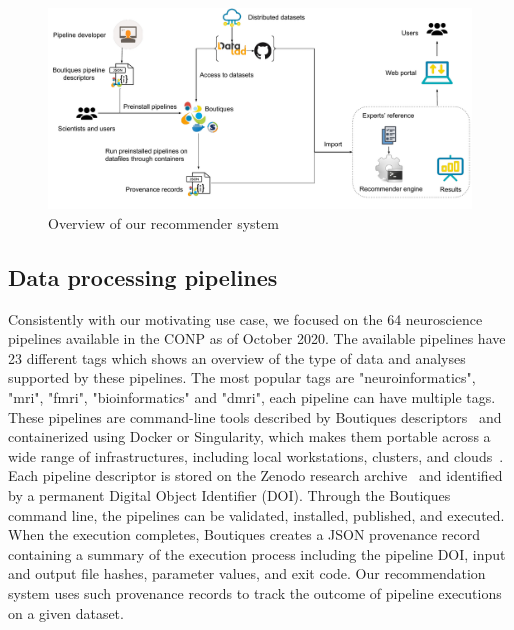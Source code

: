 %   


\begin{figure}[ht]
  \centering
  \includegraphics[width=\textwidth]{figures/Methodology.pdf}%
  \caption{Overview of our recommender system}
  \label{fig:method}
  \end{figure}  


\subsection{Data processing pipelines} 
Consistently with our motivating use case, we focused on the 64
neuroscience pipelines available in the CONP as of October
2020. 
The available pipelines have 23 different tags which shows an overview of the type of data
and analyses supported by these pipelines. The most popular tags are "neuroinformatics", "mri", "fmri", "bioinformatics" and "dmri", each pipeline can have multiple tags. These pipelines are command-line
tools described by Boutiques descriptors~\cite{glatard2018boutiques} and
containerized using Docker or Singularity, which makes them portable across
a wide range of infrastructures, including local workstations, clusters,
and clouds~\cite{kiar2019serverless}. Each pipeline descriptor is stored on
the Zenodo research archive~\cite{https://doi.org/10.25495/7gxk-rd71} and identified by a permanent Digital Object
Identifier (DOI). Through the Boutiques command line, the pipelines can be
validated, installed, published, and executed. When the execution
completes, Boutiques creates a JSON provenance record containing a summary
of the execution process including the pipeline DOI, input and output file
hashes, parameter values, and exit code. Our recommendation system uses
such provenance records to track the outcome of pipeline executions on a
given dataset.



